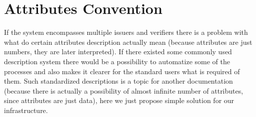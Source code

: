 \section{Attributes Convention}
If the system encompasses multiple issuers and verifiers there is a problem with what do certain attributes description actually mean (because attributes are just numbers, they are later interpreted). If there existed some commonly used description system there would be a possibility to automatize some of the processes and also makes it clearer for the standard users what is required of them. Such standardized descriptions is a topic for another documentation (because there is actually a possibility of almost infinite number of attributes, since attributes are just data), here we just propose simple solution for our infrastructure.

